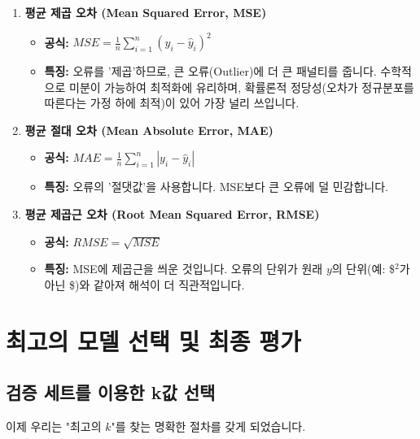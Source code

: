 \documentclass[11pt,a4paper]{book}
\theoremstyle{definition}
\begin{document}
\begin{defbox}[title={주요 손실 함수}]
\begin{enumerate}
    \item \textbf{평균 제곱 오차 (Mean Squared Error, MSE)}
        \begin{itemize}
            \item \textbf{공식:} $MSE = \frac{1}{n}\sum_{i=1}^{n}(y_i - \hat{y}_i)^2$
            \item \textbf{특징:} 오류를 '제곱'하므로, 큰 오류(Outlier)에 더 큰 패널티를 줍니다. 수학적으로 미분이 가능하여 최적화에 유리하며, 확률론적 정당성(오차가 정규분포를 따른다는 가정 하에 최적)이 있어 가장 널리 쓰입니다.
        \end{itemize}
    \item \textbf{평균 절대 오차 (Mean Absolute Error, MAE)}
        \begin{itemize}
            \item \textbf{공식:} $MAE = \frac{1}{n}\sum_{i=1}^{n}|y_i - \hat{y}_i|$
            \item \textbf{특징:} 오류의 '절댓값'을 사용합니다. MSE보다 큰 오류에 덜 민감합니다.
        \end{itemize}
    \item \textbf{평균 제곱근 오차 (Root Mean Squared Error, RMSE)}
        \begin{itemize}
            \item \textbf{공식:} $RMSE = \sqrt{MSE}$
            \item \textbf{특징:} MSE에 제곱근을 씌운 것입니다. 오류의 단위가 원래 $y$의 단위(예: \$$^2$가 아닌 \$)와 같아져 해석이 더 직관적입니다.
        \end{itemize}
\end{enumerate}
\end{defbox}


\section{최고의 모델 선택 및 최종 평가}

\subsection{검증 세트를 이용한 k값 선택}

이제 우리는 "최고의 $k$"를 찾는 명확한 절차를 갖게 되었습니다.
\end{document}
